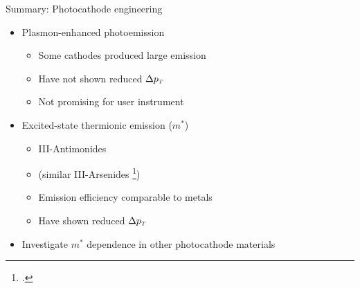 \begin{frame}{Summary: Photocathode engineering}
\begin{itemize}
  \item Plasmon-enhanced photoemission
  \begin{itemize}
    \item Some cathodes produced large emission
    \item \alert{Have not} shown reduced $\Delta p_{{ \scriptscriptstyle T }}$
    \item Not promising for user instrument
  \end{itemize}
  \item<2-> Excited-state thermionic emission ($m^*$)
  \begin{itemize}
    \item<2-> III-Antimonides
    \item<2-> (similar III-Arsenides \footcite{liu_narrow_2005})
    \item<2-> Emission efficiency comparable to metals
    \item<2-> \alert{Have} shown reduced $\Delta p_{{ \scriptscriptstyle T }}$
  \end{itemize}
  \item<3-> Investigate $m^*$ dependence in other photocathode materials
\end{itemize}
\end{frame}

